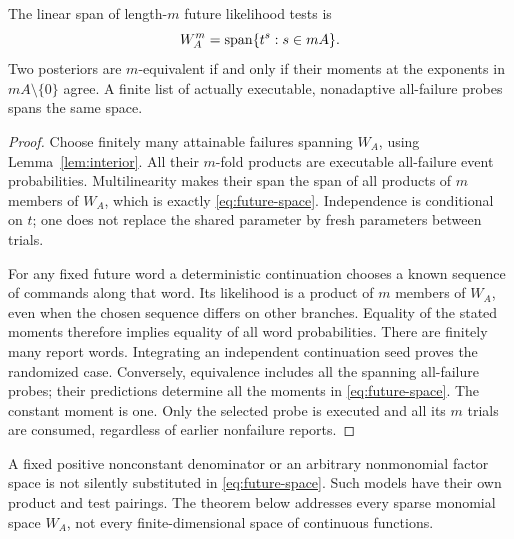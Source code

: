 \begin{proposition}\label{prop:tests}
The linear span of length-$m$ future likelihood tests is
\begin{equation}\label{eq:future-space}
 W_A^m=\operatorname{span}\{t^s:s\in mA\}.
\end{equation}
Two posteriors are $m$-equivalent if and only if their moments at the
exponents in $mA\setminus\{0\}$ agree. A finite list of actually
executable, nonadaptive all-failure probes spans the same space.
\end{proposition}
\begin{proof}
Choose finitely many attainable failures spanning $W_A$, using
Lemma~\ref{lem:interior}. All their $m$-fold products are executable
all-failure event probabilities. Multilinearity makes their span the
span of all products of $m$ members of $W_A$, which is exactly
\eqref{eq:future-space}. Independence is conditional on $t$; one does
not replace the shared parameter by fresh parameters between trials.

For any fixed future word a deterministic continuation chooses a known
sequence of commands along that word. Its likelihood is a product of
$m$ members of $W_A$, even when the chosen sequence differs on other
branches. Equality of the stated moments therefore implies equality of
all word probabilities. There are finitely many report words. Integrating
an independent continuation seed proves the randomized case. Conversely,
equivalence includes all the spanning all-failure probes; their predictions
determine all the moments in \eqref{eq:future-space}. The constant moment
is one. Only the selected probe is executed and all its $m$ trials are
consumed, regardless of earlier nonfailure reports.
\end{proof}

A fixed positive nonconstant denominator or an arbitrary nonmonomial
factor space is not silently substituted in \eqref{eq:future-space}.
Such models have their own product and test pairings. The theorem below
addresses every sparse monomial space $W_A$, not every finite-dimensional
space of continuous functions.
